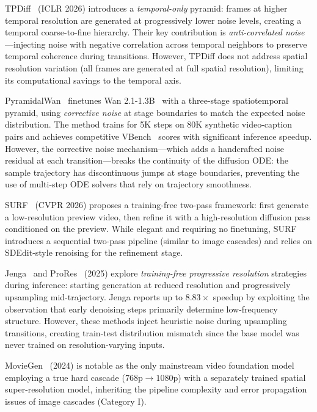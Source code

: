 TPDiff~\citep{liu2025tpdiff} (ICLR 2026) introduces a \emph{temporal-only} pyramid: frames at higher temporal resolution are generated at progressively lower noise levels, creating a temporal coarse-to-fine hierarchy.
Their key contribution is \emph{anti-correlated noise}---injecting noise with negative correlation across temporal neighbors to preserve temporal coherence during transitions.
However, TPDiff does not address spatial resolution variation (all frames are generated at full spatial resolution), limiting its computational savings to the temporal axis.

PyramidalWan~\citep{liu2025pyramidalwan} finetunes Wan 2.1-1.3B~\citep{wan2025wan} with a three-stage spatiotemporal pyramid, using \emph{corrective noise} at stage boundaries to match the expected noise distribution.
The method trains for 5K steps on 80K synthetic video-caption pairs and achieves competitive VBench~\citep{huang2024vbench} scores with significant inference speedup.
However, the corrective noise mechanism---which adds a handcrafted noise residual at each transition---breaks the continuity of the diffusion ODE: the sample trajectory has discontinuous jumps at stage boundaries, preventing the use of multi-step ODE solvers that rely on trajectory smoothness.

SURF~\citep{xu2026surf} (CVPR 2026) proposes a training-free two-pass framework: first generate a low-resolution preview video, then refine it with a high-resolution diffusion pass conditioned on the preview.
While elegant and requiring no finetuning, SURF introduces a sequential two-pass pipeline (similar to image cascades) and relies on SDEdit-style renoising for the refinement stage.

Jenga~\citep{xu2025jenga} and ProRes~\citep{zhang2025prores} (2025) explore \emph{training-free progressive resolution} strategies during inference: starting generation at reduced resolution and progressively upsampling mid-trajectory.
Jenga reports up to $8.83\times$ speedup by exploiting the observation that early denoising steps primarily determine low-frequency structure.
However, these methods inject heuristic noise during upsampling transitions, creating train-test distribution mismatch since the base model was never trained on resolution-varying inputs.

MovieGen~\citep{polyak2024moviegen} (2024) is notable as the only mainstream video foundation model employing a true hard cascade ($768\text{p} \to 1080\text{p}$) with a separately trained spatial super-resolution model, inheriting the pipeline complexity and error propagation issues of image cascades (Category I).

